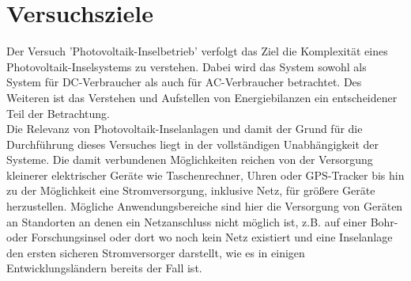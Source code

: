 \section{Versuchsziele}
Der Versuch 'Photovoltaik-Inselbetrieb' verfolgt das Ziel die Komplexität eines 
 Photovoltaik-Inselsystems zu verstehen. Dabei wird das System sowohl als System 
 für DC-Verbraucher als auch für AC-Verbraucher betrachtet. Des Weiteren ist das
 Verstehen und Aufstellen von Energiebilanzen ein entscheidener Teil der Betrachtung.\\
 Die Relevanz von Photovoltaik-Inselanlagen und damit der Grund für die Durchführung
 dieses Versuches liegt in der vollständigen Unabhängigkeit der Systeme. Die damit
 verbundenen Möglichkeiten reichen von der Versorgung kleinerer elektrischer Geräte
 wie Taschenrechner, Uhren oder GPS-Tracker bis hin zu der Möglichkeit eine Stromversorgung,
 inklusive Netz, für größere Geräte herzustellen.
 Mögliche Anwendungsbereiche sind hier die Versorgung von Geräten an Standorten
 an denen ein Netzanschluss nicht möglich ist, z.B. auf einer Bohr- oder Forschungsinsel
 oder dort wo noch kein Netz existiert und eine Inselanlage den ersten sicheren
 Stromversorger darstellt, wie es in einigen Entwicklungsländern bereits der Fall ist.\\
